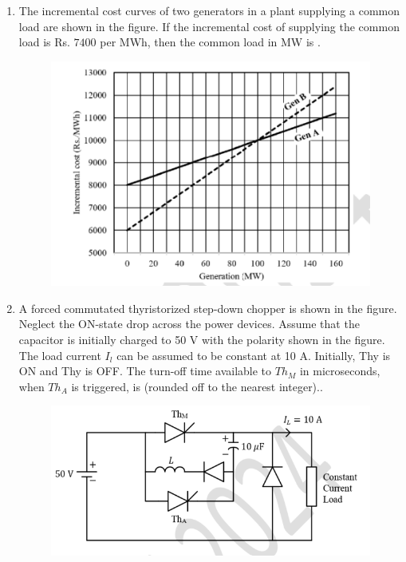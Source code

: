 \documentclass[journal,12pt,onecolumn]{IEEEtran}
\theoremstyle{remark}
\begin{document}
\begin{enumerate}[start=1, label=Q.\arabic*]
    \hfill{}

    \item The incremental cost curves of two generators  in a plant supplying a common load are shown in the figure. If the incremental cost of supplying the common load is Rs. $7400$ per MWh, then the common load in MW is \underline{\hspace{2cm}} .
    \begin{figure}[H]
        \centering
        \includegraphics[width=0.6\columnwidth]{q34}
        \caption{}
    \end{figure}

    \hfill{}

    \item  A forced commutated thyristorized step-down chopper is shown in the figure.
Neglect the ON-state drop across the power devices. Assume that the capacitor is
initially charged to 50 V with the polarity shown in the figure. The load current $I_l$
can be assumed to be constant at 10 A. Initially, Thy is ON and Thy is OFF. The
turn-off time available to $Th_M$ in microseconds, when $Th_A$ is triggered, is
(rounded off to the nearest integer)..
    \begin{figure}[H]
        \centering
        \includegraphics[width=0.5\columnwidth]{q35}
        \caption{}
    \end{figure}

    \hfill{}


\end{enumerate}
\end{document}
